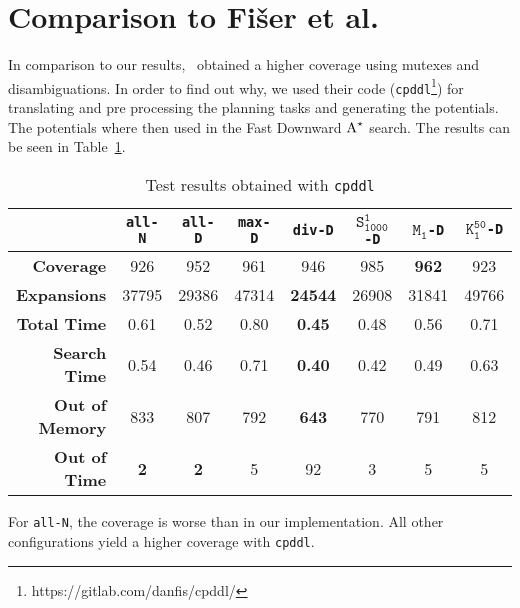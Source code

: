 \section{Comparison to Fi{\v{s}}er et al.}\label{sec:comparison-to-fiser}
In comparison to our results,~\cite{fivser2020strengthening} obtained a higher coverage using mutexes and disambiguations.
In order to find out why, we used their code (\texttt{cpddl}\footnote{https://gitlab.com/danfis/cpddl/}) for translating and pre processing the planning tasks and generating the potentials.
The potentials where then used in the Fast Downward $\textup{A}^\star$ search.
The results can be seen in Table~\ref{table:fiser}.

\begin{table}[h!]
    \begin{center}
        \begin{tabular}{|r|c|c|c|c|c|c|c|}
            \hline
            & \textbf{\texttt{all-N}} & \textbf{\texttt{all-D}} & \textbf{\texttt{max-D}} & \textbf{\texttt{div-D}} & \textbf{$\texttt{S}_\texttt{1000}^\texttt{1}$\texttt{-D}} & \textbf{$\texttt{M}_\texttt{1}$\texttt{-D}} & \textbf{$\texttt{K}_\texttt{1}^\texttt{50}$\texttt{-D}} \\
            \hline \hline
            \textbf{Coverage}       & 926       & 952       & 961   & 946           & 985   & \textbf{962}  & 923   \\ \hline
            \textbf{Expansions}     & 37795     & 29386     & 47314 & \textbf{24544}& 26908 & 31841         & 49766 \\ \hline
            \textbf{Total Time}     & 0.61      & 0.52      & 0.80  & \textbf{0.45} & 0.48  & 0.56          & 0.71  \\ \hline
            \textbf{Search Time}    & 0.54      & 0.46      & 0.71  & \textbf{0.40} & 0.42  & 0.49          & 0.63  \\ \hline
            \textbf{Out of Memory}  & 833       & 807       & 792   & \textbf{643}  & 770   & 791           & 812   \\ \hline
            \textbf{Out of Time}    & \textbf{2}& \textbf{2}& 5     & 92            & 3     & 5             & 5     \\ \hline
        \end{tabular}
        \caption{Test results obtained with \texttt{cpddl}}
        \label{table:fiser}
    \end{center}
\end{table}

For \texttt{all-N}, the coverage is worse than in our implementation.
All other configurations yield a higher coverage with \texttt{cpddl}.

